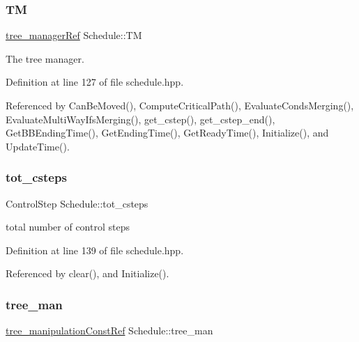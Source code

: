 \subsubsection{\texorpdfstring{TM}{TM}}
{\footnotesize\ttfamily \hyperlink{tree__manager_8hpp_a96ff150c071ce11a9a7a1e40590f205e}{tree\+\_\+manager\+Ref} Schedule\+::\+TM\hspace{0.3cm}{\ttfamily [private]}}



The tree manager. 



Definition at line 127 of file schedule.\+hpp.



Referenced by Can\+Be\+Moved(), Compute\+Critical\+Path(), Evaluate\+Conds\+Merging(), Evaluate\+Multi\+Way\+Ifs\+Merging(), get\+\_\+cstep(), get\+\_\+cstep\+\_\+end(), Get\+B\+B\+Ending\+Time(), Get\+Ending\+Time(), Get\+Ready\+Time(), Initialize(), and Update\+Time().

\mbox{\label{classSchedule_a1d65d93a4de64bed41f252422162f990}} 
\subsubsection{\texorpdfstring{tot\+\_\+csteps}{tot\_csteps}}
{\footnotesize\ttfamily Control\+Step Schedule\+::tot\+\_\+csteps\hspace{0.3cm}{\ttfamily [private]}}



total number of control steps 



Definition at line 139 of file schedule.\+hpp.



Referenced by clear(), and Initialize().

\mbox{\label{classSchedule_a626c40e8391df80cbf334381ae6d1ed9}} 
\subsubsection{\texorpdfstring{tree\+\_\+man}{tree\_man}}
{\footnotesize\ttfamily \hyperlink{tree__manipulation_8hpp_af8a30f3f306569d7681c1b5af9ddd9d0}{tree\+\_\+manipulation\+Const\+Ref} Schedule\+::tree\+\_\+man\hspace{0.3cm}{\ttfamily [private]}}



